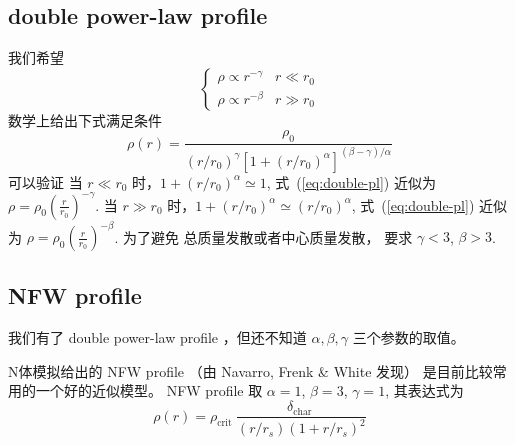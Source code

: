 \documentclass[12pt]{ctexart}
\newcommand{\refeq}[1]{式~(\ref{#1})}
\begin{document}
\subsection{double power-law profile}
我们希望
\begin{equation}
    \begin{cases}\rho \propto r^{-\gamma} & r \ll r_{0} \\ \rho \propto r^{-\beta} & r \gg r_{0}\end{cases}
\end{equation}
数学上给出下式满足条件
\begin{equation} \label{eq:double-pl}
    \rho(r)=\frac{\rho_{0}}{\left(r / r_{0}\right)^{\gamma}\left[1+\left(r / r_{0}\right)^{\alpha}\right]^{(\beta-\gamma) / \alpha}}
\end{equation}
可以验证
当 $r \ll r_0$ 时，$1+(r/r_0)^\alpha \simeq 1$, \refeq{eq:double-pl} 近似为 $\rho = \rho_0 \left(\frac{r}{r_0}\right) ^{-\gamma}$. 
当 $r \gg r_0$ 时，$1+(r/r_0)^\alpha \simeq (r/r_0)^\alpha$, \refeq{eq:double-pl} 近似为 $\rho = \rho_0 \left(\frac{r}{r_0}\right) ^{-\beta}$.
为了避免 总质量发散或者中心质量发散，
要求
$\gamma < 3$, $\beta > 3$.

\subsection{NFW profile}

我们有了 double power-law profile ，但还不知道 $\alpha, \beta, \gamma$ 三个参数的取值。

N体模拟给出的 NFW profile （由 Navarro, Frenk \& White 发现） 是目前比较常用的一个好的近似模型。
NFW profile 取 $\alpha =1$, $\beta=3$, $\gamma =1$,  其表达式为
\begin{equation} \label{eq:NFW}
    \rho(r)=\rho_{\text {crit }} \frac{\delta_{\text {char }}}{\left(r / r_{s}\right)\left(1+r / r_{s}\right)^{2}}
\end{equation}
\end{document}
